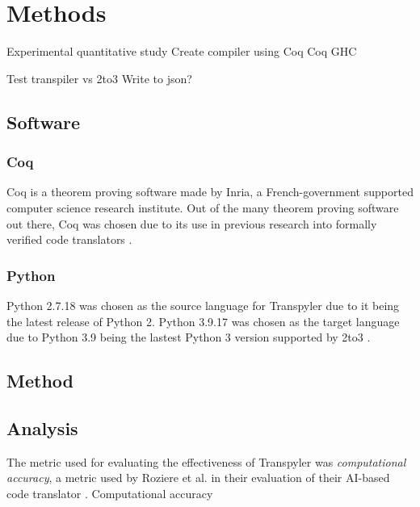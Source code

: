 \section{Methods}
Experimental quantitative study
Create compiler using Coq
Coq
GHC

Test transpiler vs 2to3
Write to json?
\subsection{Software}
\subsubsection{Coq}
Coq is a theorem proving software made by Inria, a French-government supported computer science research institute. Out of the many theorem proving software out there, Coq was chosen due to its use in previous research into formally verified code translators \autocite{Roziere}\autocite{Zhao}.
\subsubsection{Python}
Python 2.7.18 was chosen as the source language for Transpyler due to it being the latest release of Python 2. Python 3.9.17 was chosen as the target language due to Python 3.9 being the lastest Python 3 version supported by 2to3 \autocite{2to3}.
\subsection{Method}
\subsection{Analysis}
The metric used for evaluating the effectiveness of Transpyler was \textit{computational accuracy}, a metric used by Roziere et al. in their evaluation of their AI-based code translator \autocite{Roziere}. Computational accuracy 
